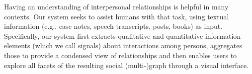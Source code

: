 Having an understanding of interpersonal relationships is helpful in many contexts. Our system seeks to assist humans with that task, using textual information (e.g., case notes, speech transcripts, posts, books) as input. Specifically, our system first extracts qualitative and quantitative information elements (which we call signals) about interactions among persons, aggregates those to provide a condensed view of relationships and then enables users to explore all facets of the resulting social (multi-)graph through a visual interface.
